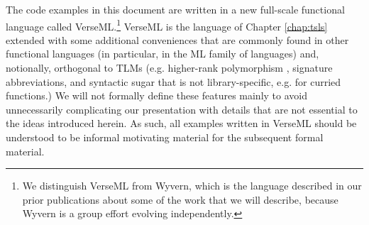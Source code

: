 The code examples in this document are written in a new full-scale functional language called VerseML.\footnote{We distinguish VerseML from Wyvern, which is the language described in our prior publications about some of the work that we will describe, because Wyvern is a group effort evolving independently.} VerseML is the language of Chapter \ref{chap:tsls}  extended with some additional conveniences that are commonly found in other functional languages (in particular, in the ML family of languages) and, notionally, orthogonal to TLMs (e.g. higher-rank polymorphism \cite{conf/icfp/DunfieldK13}, signature abbreviations, and syntactic sugar that is not library-specific, e.g. for curried functions.) %
We will not formally define these features mainly to avoid unnecessarily complicating our presentation with details that are not essential to the ideas introduced herein. As such, all examples written in VerseML should be understood to be informal motivating material for the subsequent formal material. %


